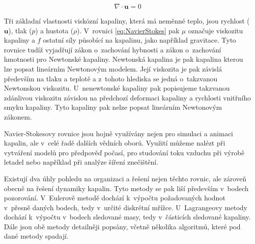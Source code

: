 \begin{equation}
	\nabla \cdot \mathbf{u} = 0
	\label{eq:NavierStokes2}
\end{equation}

Tři základní vlastnosti viskózní kapaliny, která má neměnné teplo, jsou rychlost ($\mathbf{u}$), tlak ($p$) a hustota ($\rho$). V~rovnici \ref{eq:NavierStokes} pak $\mu$ označuje viskozitu kapaliny a $f$ ostatní síly působící na kapalinu, jako například gravitace. Tyto rovnice tudíž vyjadřují zákon o~zachování hybnosti a zákon o~zachování hmotnosti pro Newtonské kapaliny. Newtonská kapalina je pak kapalina kterou lze popsat lineárním Newtonovým modelem. Její viskozita je pak závislá především na tlaku a teplotě a z~tohoto hlediska se jedná o~takzvanou Newtonskou viskozitu. U~nenewtonské kapaliny pak popisujeme takzvanou zdánlivou viskozitu závislou na předchozí deformaci kapaliny a rychlosti vnitřního smyku kapaliny. Tyto kapaliny pak nelze popsat lineárním Newtonovým zákonem.\cite{StejskalJan2013Pmks}

Navier-Stokesovy rovnice jsou hojně využívány nejen pro simulaci a animaci kapalin, ale v~celé řadě dalších vědních oborů. Využití můžeme nalézt při vytváření modelů pro předpověď počasí, pro studování toku vzduchu při výrobě letadel nebo například při analýze šíření znečištění.
\break

Existují dva úhly pohledu na organizaci a řešení nejen těchto rovnic, ale zároveň obecně na řešení dynamiky kapalin. Tyto metody se pak liší především v~bodech pozorování. V~Eulerově metodě dochází k~výpočtu požadovaných hodnot v~přesně daných bodech, tedy v~určité diskrétní mřížce. U~Lagrangeovy metody dochází k~výpočtu v~bodech sledované masy, tedy v~částicích sledované kapaliny. Dále jsou obě metody detailněji popsány, včetně několika algoritmů, které pod dané metody spadají.


